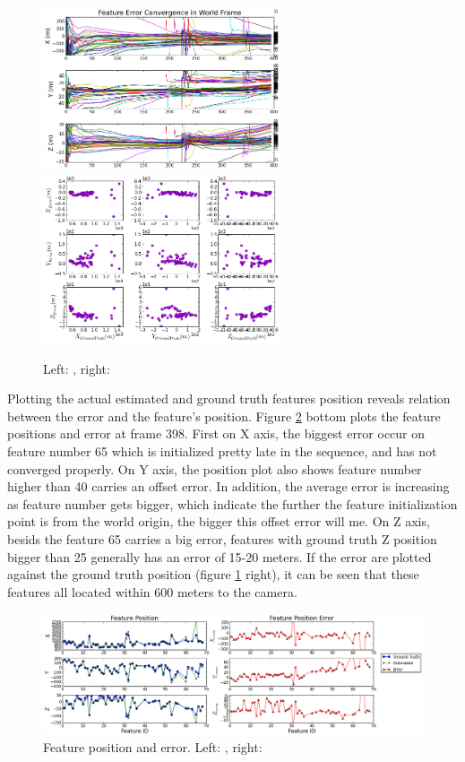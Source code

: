 \begin{figure}[h]
\centering
\includegraphics[width=7cm, keepaspectratio=true]
{./Figures/fltfig/cut1/Figure50.png}
\includegraphics[width=7cm, keepaspectratio=true]
{./Figures/fltfig/cut1/Figure80.png}
\caption{Left: , right: }
\label{fltfig:8}
\end{figure}

Plotting the actual estimated and ground truth features position
reveals relation between the error and the feature's position. Figure
\ref{fltfig:9} bottom plots the feature positions and error at frame
398. First on X axis, the biggest error occur on feature number 65
which is initialized pretty late in the sequence, and has not
converged properly. On Y axis, the position plot also shows feature
number higher than 40 carries an offset error. In addition, the
average error is increasing as feature number gets bigger, which
indicate the further the feature initialization point is from the
world origin, the bigger this offset error will me. On Z axis, besids
the feature 65 carries a big error, features with ground truth Z
position bigger than 25 generally has an error of 15-20 meters. If the
error are plotted against the ground truth position (figure
\ref{fltfig:8} right), it can be seen that these features all
located within 600 meters to the camera. 

\begin{figure}[h]
\centering
\includegraphics[width=14cm, keepaspectratio=true]
{./Figures/fltfig/cut1/Figure60.png}
\caption{Feature position and error. Left: , right: }
\label{fltfig:9}
\end{figure}


